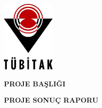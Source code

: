 \documentclass[11pt]{article}
\begin{document}
\pagestyle{fancy}
   \lhead{}\rhead{}
   \lfoot{\textcolor{light-gray}{\small Proje Sonuç Raporu}}
        \cfoot{{\thepage}}
        \rfoot{}
  \renewcommand{\headrulewidth}{0pt}

\label{coverpage}

\renewcommand{\figurename}{\bf Şekil}
\renewcommand{\tablename}{\bf Tablo}
\renewcommand{\contentsname}{İçindekiler}
\renewcommand{\refname}{Referanslar}
\renewcommand{\listfigurename}{Şekiller}
\renewcommand{\listtablename}{Tablolar}

\newpage
\phantom{22}
\vspace{-3cm}



\begin{center}
\includegraphics[keepaspectratio]{tubitak.png}

\bigskip
\bigskip


\bigskip
{\fontsize{15}{10}\selectfont 
\bigskip


\bigskip
\medskip
{ \textbf{\Huge PROJE BAŞLIĞI \\}}}


\bigskip
\medskip
{ \textbf{ PROJE SONUÇ RAPORU}}
\bigskip





\end{center}


\bigskip
\end{document}
